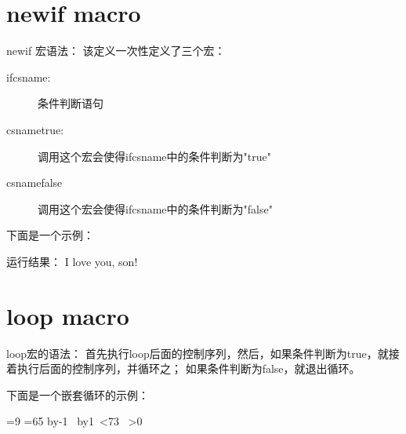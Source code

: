 ﻿\documentclass{article}
\begin{document}
  \tt %

  \pagestyle{header}
  \sybmaketitle
  \tableofcontents
  \newpage

  \pagestyle{main}
  \setcounter{page}{1}

  \section[newif macro]{\bs newif macro}
  \bs newif 宏语法：
  该定义一次性定义了三个宏：
  \begin{description}
    \item[\bs if\lt csname\gt:] 条件判断语句
    \item[\bs\lt csname\gt true:] 调用这个宏会使得\bs if\lt csname\gt 中的条件判断为"true"
    \item[\bs\lt csname\gt false] 调用这个宏会使得\bs if\lt csname\gt 中的条件判断为"false"
  \end{description}
  下面是一个示例：

  \begin{latexcode}
\newif\ifboy
\newif\ifgirl
\ifboytrue
\ifboy{I love you, son!}\fi
\ifgirl{I love you, daughter!}\fi
  \end{latexcode}

  运行结果：
  \newif\ifboy
  \newif\ifgirl
  \boytrue
  \ifboy{I love you, son!}\fi
  \ifgirl{I love you, daughter!}\fi

  \section[loop macro]{loop macro}
  \bs loop宏的语法：
  首先执行\bs loop后面的控制序列，然后，如果条件判断为true，就接着执行后面的控制序列，并循环之；
  如果条件判断为false，就退出循环。

  下面是一个嵌套循环的示例：

  \begin{latexcode}
\vbox{
  =9
  \loop
    =65 %
    \advance{} by-1
    \hbox{%
      \loop
      \char{} \the{}
      \advance{} by1
      \ifnum{}<73
      \space
      \repeat
    }
  \ifnum{}>0
  \repeat
}
  \end{latexcode}
  
\end{document}
